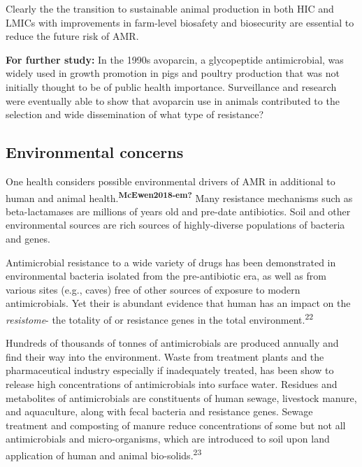 \documentclass[
]{book}
\begin{document}
Clearly the the transition to sustainable animal production in both HIC and LMICs with improvements in farm-level biosafety and biosecurity are essential to reduce the future risk of AMR.

\textbf{For further study:} In the 1990s avoparcin, a glycopeptide antimicrobial, was widely used in growth promotion in pigs and poultry production that was not initially thought to be of public health importance. Surveillance and research were eventually able to show that avoparcin use in animals contributed to the selection and wide dissemination of what type of resistance?

\hypertarget{environmental-concerns}{%
\subsection*{Environmental concerns}\label{environmental-concerns}}

One health considers possible environmental drivers of AMR in additional to human and animal health.\textsuperscript{\textbf{McEwen2018-em?}} Many resistance mechanisms such as beta-lactamases are millions of years old and pre-date antibiotics. Soil and other environmental sources are rich sources of highly-diverse populations of bacteria and genes.

Antimicrobial resistance to a wide variety of drugs has been demonstrated in environmental bacteria isolated from the pre-antibiotic era, as well as from various sites (e.g., caves) free of other sources of exposure to modern antimicrobials. Yet their is abundant evidence that human has an impact on the \emph{resistome}- the totality of or resistance genes in the total environment.\textsuperscript{22}

Hundreds of thousands of tonnes of antimicrobials are produced annually and find their way into the environment. Waste from treatment plants and the pharmaceutical industry especially if inadequately treated, has been show to release high concentrations of antimicrobials into surface water. Residues and metabolites of antimicrobials are constituents of human sewage, livestock manure, and aquaculture, along with fecal bacteria and resistance genes. Sewage treatment and composting of manure reduce concentrations of some but not all antimicrobials and micro-organisms, which are introduced to soil upon land application of human and animal bio-solids.\textsuperscript{23}
\end{document}
